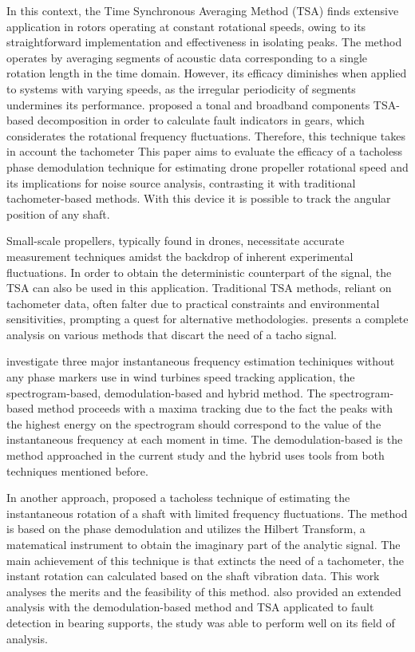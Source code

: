 \documentclass[10pt,fleqn,a4paper,twoside]{article}
\begin{document}
In this context, the Time Synchronous Averaging Method (TSA) \citep{MCFADDEN1987173} finds extensive application in rotors operating at constant rotational speeds, owing to its straightforward implementation and effectiveness in isolating peaks. The method operates by averaging segments of acoustic data corresponding to a single rotation length in the time domain. However, its efficacy diminishes when applied to systems with varying speeds, as the irregular periodicity of segments undermines its performance. \cite{SHARMA2016560} proposed a tonal and broadband components TSA-based decomposition in order to calculate fault indicators in gears, which considerates the rotational frequency fluctuations. Therefore, this technique takes in account the tachometer This paper aims to evaluate the efficacy of a tacholess phase demodulation technique for estimating drone propeller rotational speed and its implications for noise source analysis, contrasting it with traditional tachometer-based methods. With this device it is possible to track the angular position of any shaft. 

Small-scale propellers, typically found in drones, necessitate accurate measurement techniques amidst the backdrop of inherent experimental fluctuations. In order to obtain the deterministic counterpart of the signal, the TSA can also be used in this application. Traditional TSA methods, reliant on tachometer data, often falter due to practical constraints and environmental sensitivities, prompting a quest for alternative methodologies. \cite{article} presents a complete analysis on various methods that discart the need of a tacho signal.

\cite{Urbanek2011ComparisonOA} investigate three major instantaneous frequency estimation techiniques without any phase markers use in wind turbines speed tracking application, the spectrogram-based, demodulation-based and hybrid method. The spectrogram-based method proceeds with a maxima tracking due to the fact the peaks with the highest energy on the spectrogram should correspond to the value of the instantaneous frequency at each moment in time. The demodulation-based is the method approached in the current study and the hybrid uses tools from both techniques mentioned before.

In another approach,\cite{BONNARDOT2005766} proposed a tacholess technique of estimating the instantaneous rotation of a shaft with limited frequency fluctuations. The method is based on the phase demodulation and utilizes the Hilbert Transform, a matematical instrument to obtain the imaginary part of the analytic signal. The main achievement of this technique is that extincts the need of a tachometer, the instant rotation can calculated based on the shaft vibration data. This work analyses the merits and the feasibility of this method. \cite{knust2023diss} also provided an extended analysis with the demodulation-based method and TSA applicated to fault detection in bearing supports, the study was able to perform well on its field of analysis.
\end{document}
